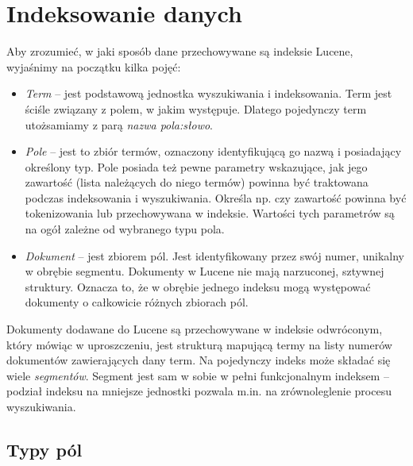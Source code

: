 \section{Indeksowanie danych}

Aby zrozumieć, w jaki sposób dane przechowywane są indeksie Lucene, wyjaśnimy na początku kilka pojęć:
\begin{itemize}
 \item \emph{Term} -- jest podstawową jednostka wyszukiwania i indeksowania. Term jest ściśle związany z polem, w jakim występuje. Dlatego pojedynczy term utożsamiamy z parą \emph{nazwa pola:słowo}.
 \item \emph{Pole} -- jest to zbiór termów, oznaczony identyfikującą go nazwą i posiadający określony typ. Pole posiada też pewne parametry wskazujące, jak jego zawartość (lista należących do niego termów) powinna być traktowana podczas indeksowania i wyszukiwania. Określa np. czy zawartość powinna być tokenizowania lub przechowywana w indeksie. Wartości tych parametrów są na ogół zależne od wybranego typu pola.
 \item \emph{Dokument} -- jest zbiorem pól. Jest identyfikowany przez swój numer, unikalny w obrębie segmentu. Dokumenty w Lucene nie mają narzuconej, sztywnej struktury. Oznacza to, że w obrębie jednego indeksu mogą występować dokumenty o całkowicie różnych zbiorach pól. 
\end{itemize}

Dokumenty dodawane do Lucene są przechowywane w indeksie odwróconym, który mówiąc w uproszczeniu, jest strukturą mapującą termy na listy numerów dokumentów zawierających dany term. Na pojedynczy indeks może składać się wiele \emph{segmentów}. Segment jest sam w sobie w pełni funkcjonalnym indeksem -- podział indeksu na mniejsze jednostki pozwala m.in. na zrównoleglenie procesu wyszukiwania.

\subsection{Typy pól}

